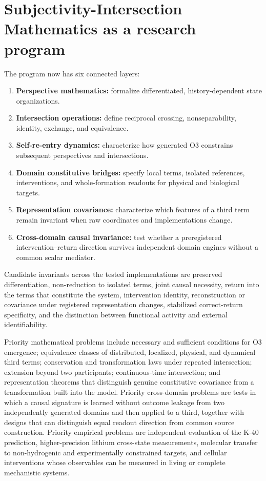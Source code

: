 \documentclass[11pt,a4paper]{article}
\begin{document}
\section{Subjectivity-Intersection Mathematics as a research program}

The program now has six connected layers:
\begin{enumerate}
  \item \textbf{Perspective mathematics:} formalize differentiated, history-dependent state organizations.
  \item \textbf{Intersection operations:} define reciprocal crossing, nonseparability, identity, exchange, and equivalence.
  \item \textbf{Self-re-entry dynamics:} characterize how generated O3 constrains subsequent perspectives and intersections.
  \item \textbf{Domain constitutive bridges:} specify local terms, isolated references, interventions, and whole-formation readouts for physical and biological targets.
  \item \textbf{Representation covariance:} characterize which features of a third term remain invariant when raw coordinates and implementations change.
  \item \textbf{Cross-domain causal invariance:} test whether a preregistered intervention--return direction survives independent domain engines without a common scalar mediator.
\end{enumerate}

Candidate invariants across the tested implementations are preserved differentiation, non-reduction to isolated terms, joint causal necessity, return into the terms that constitute the system, intervention identity, reconstruction or covariance under registered representation changes, stabilized correct-return specificity, and the distinction between functional activity and external identifiability.

Priority mathematical problems include necessary and sufficient conditions for O3 emergence; equivalence classes of distributed, localized, physical, and dynamical third terms; conservation and transformation laws under repeated intersection; extension beyond two participants; continuous-time intersection; and representation theorems that distinguish genuine constitutive covariance from a transformation built into the model. Priority cross-domain problems are tests in which a causal signature is learned without outcome leakage from two independently generated domains and then applied to a third, together with designs that can distinguish equal readout direction from common source construction. Priority empirical problems are independent evaluation of the K-40 prediction, higher-precision lithium cross-state measurements, molecular transfer to non-hydrogenic and experimentally constrained targets, and cellular interventions whose observables can be measured in living or complete mechanistic systems.
\end{document}
